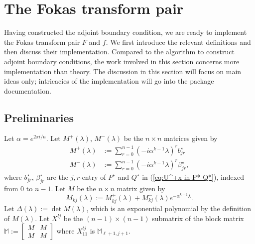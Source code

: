 \documentclass[11pt, oneside, a4paper]{article}
\begin{document}
\section{The Fokas transform pair}
Having constructed the adjoint boundary condition, we are ready to implement the Fokas transform pair $F$ and $f$\cite[p.10]{Smith2016}. We first introduce the relevant definitions and then discuss their implementation. Compared to the algorithm to construct adjoint boundary conditions, the work involved in this section concerns more implementation than theory. The discussion in this section will focus on main ideas only; intricacies of the implementation will go into the package documentation.

\subsection{Preliminaries}
Let $\alpha = e^{2\pi i/n}$. Let $M^+(\lambda)$, $M^-(\lambda)$ be the $n\times n$ matrices given by
\begin{align*}
    M^+(\lambda) &:= \sum_{r=0}^{n-1}(-i\alpha^{k-1}\lambda)^r b^\star_{jr}\\
    M^-(\lambda) &:= \sum_{r=0}^{n-1}(-i\alpha^{k-1}\lambda)^r \beta^\star_{jr},
\end{align*}
where $b^\star_{jr}$, $\beta^\star_{jr}$ are the $j,r$-entry of $P^\star$ and $Q^\star$ in (\ref{eq:U^+x in P* Q*}), indexed from $0$ to $n-1$. Let $M$ be the $n\times n$ matrix given by
\[M_{kj}(\lambda) := M^+_{kj}(\lambda) + M^-_{kj}(\lambda)e^{-\alpha^{k-1}\lambda}.\]
Let $\Delta(\lambda):=\det M(\lambda)$, which is an exponential polynomial by the definition of $M(\lambda)$. Let $X^{lj}$ be the $(n-1)\times (n-1)$ submatrix of the block matrix $\mathbb{M}:=\begin{bmatrix}M & M\\ M & M\end{bmatrix}$ where $X^{lj}_{11}$ is $\mathbb{M}_{\ell+1, j+1}$.
\end{document}
